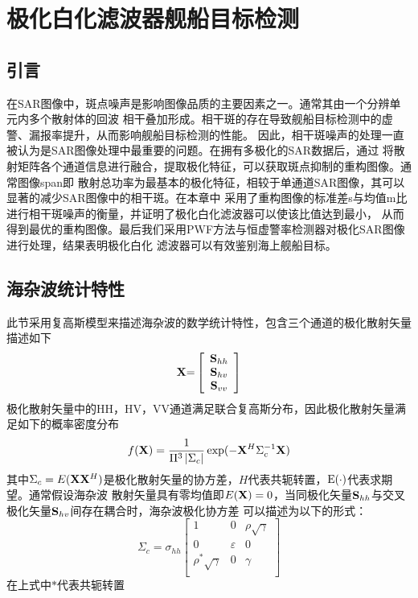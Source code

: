 \chapter{极化白化滤波器舰船目标检测}
\label{cha:PWF}

\section{引言}
\label{sec:intro}
在SAR图像中，斑点噪声是影响图像品质的主要因素之一。通常其由一个分辨单元内多个散射体的回波
相干叠加形成。相干斑的存在导致舰船目标检测中的虚警、漏报率提升，从而影响舰船目标检测的性能。
因此，相干斑噪声的处理一直被认为是SAR图像处理中最重要的问题。在拥有多极化的SAR数据后，通过
将散射矩阵各个通道信息进行融合，提取极化特征，可以获取斑点抑制的重构图像。通常图像span即
散射总功率为最基本的极化特征，相较于单通道SAR图像，其可以显著的减少SAR图像中的相干斑。在本章中
采用了重构图像的标准差s与均值m比进行相干斑噪声的衡量，并证明了极化白化滤波器可以使该比值达到最小，
从而得到最优的重构图像。最后我们采用PWF方法与恒虚警率检测器对极化SAR图像进行处理，结果表明极化白化
滤波器可以有效鉴别海上舰船目标。

\section{海杂波统计特性}
    此节采用复高斯模型来描述海杂波的数学统计特性，包含三个通道的极化散射矢量描述如下
    \begin{equation}
      {\bf{X}}{\rm{ = }}\left[ {\begin{array}{*{20}{c}}
        {{{\bf{S}}_{hh}}} \\
        {{{\bf{S}}_{hv}}} \\
        {{{\bf{S}}_{vv}}} 
        \end{array}} \right]   
    \end{equation}
    极化散射矢量中的HH，HV，VV通道满足联合复高斯分布，因此极化散射矢量满足如下的概率密度分布
    \begin{equation}
        f({\bf{X}}) = \frac{1}{{{\Pi ^3}\left| {{\Sigma _c}} \right|}}\exp ( - {{\bf{X}}^H}\Sigma _c^{ - 1}{\bf{X}})
    \end{equation}
    其中${{\Sigma _c}}=E({\bf{X}}{{\bf{X}}^H})$是极化散射矢量的协方差，$H$代表共轭转置，${\rm{E}}( \cdot )$代表求期望。通常假设海杂波
    散射矢量具有零均值即$E({\bf{X}})=0$，当同极化矢量$ {{{\bf{S}}_{hh}}}$与交叉极化矢量${{{\bf{S}}_{hv}}}$间存在耦合时，海杂波极化协方差
    可以描述为以下的形式：
    \begin{equation}
        {\Sigma _c} = {\sigma _{hh}}\left[ {\begin{matrix}
   1 & 0 & {\rho \sqrt \gamma  }  \\ 
   0 & \varepsilon  & 0  \\ 
   {{\rho ^*}\sqrt \gamma  } & 0 & \gamma   \\ 
   \end{matrix}} \right]
    \end{equation}
    在上式中$*$代表共轭转置

